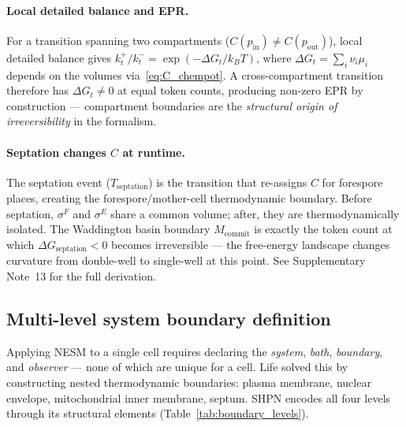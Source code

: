 \documentclass[11pt,a4paper]{article}
\begin{document}
\paragraph{Local detailed balance and EPR.}
For a transition spanning two compartments ($C(p_{\mathrm{in}}) \neq
C(p_{\mathrm{out}})$), local detailed balance gives
$k_t^+ / k_t^- = \exp(-\Delta G_t / k_BT)$, where $\Delta G_t = \sum_i
\nu_i \mu_i$ depends on the volumes via~\cref{eq:C_chempot}.  A
cross-compartment transition therefore has $\Delta G_t \neq 0$ at equal token
counts, producing non-zero EPR by construction --- compartment boundaries are
the \emph{structural origin of irreversibility} in the formalism.

\paragraph{Septation changes $C$ at runtime.}
The septation event ($T_{\text{septation}}$) is the transition that
re-assigns $C$ for forespore places, creating the forespore/mother-cell
thermodynamic boundary.  Before septation, $\sigma^F$ and $\sigma^E$ share a
common volume; after, they are thermodynamically isolated.  The Waddington
basin boundary $M_{\text{commit}}$ is exactly the token count at which
$\Delta G_{\text{septation}} < 0$ becomes irreversible --- the
free-energy landscape changes curvature from double-well to single-well at
this point.  See Supplementary Note~13 for the full derivation.

\subsection{Multi-level system boundary definition}
\label{sec:system_boundary}

Applying NESM to a single cell requires declaring the \emph{system},
\emph{bath}, \emph{boundary}, and \emph{observer} --- none of which are
unique for a cell.  Life solved this by constructing nested thermodynamic
boundaries: plasma membrane, nuclear envelope, mitochondrial inner membrane,
septum.  SHPN encodes all four levels through its structural elements
(Table~\ref{tab:boundary_levels}).
\end{document}
